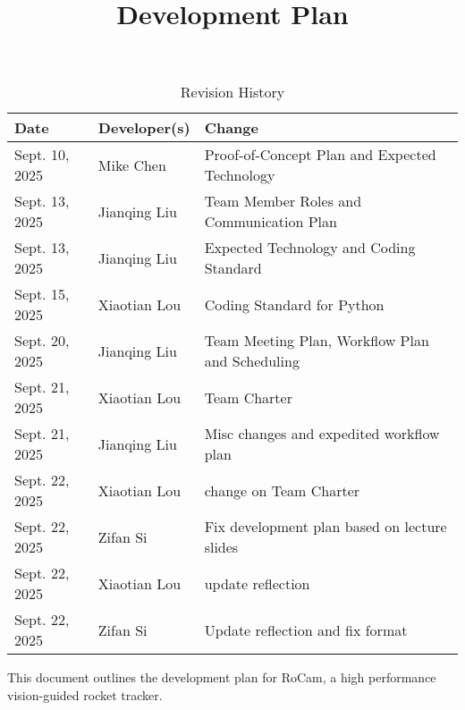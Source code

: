 \documentclass{article}
\title{Development Plan\\\progname}
\author{\authname}
\date{}
\begin{document}
\maketitle

\begin{table}[hp]
  \caption{Revision History} \label{TblRevisionHistory}
  \begin{tabularx}{\textwidth}{llX}
    \toprule
    \textbf{Date}  & \textbf{Developer(s)} & \textbf{Change}                                 \\
    \midrule
    Sept. 10, 2025 & Mike Chen             & Proof-of-Concept Plan and Expected Technology   \\
    Sept. 13, 2025 & Jianqing Liu          & Team Member Roles and Communication Plan        \\
    Sept. 13, 2025 & Jianqing Liu          & Expected Technology and Coding Standard         \\
    Sept. 15, 2025 & Xiaotian Lou          & Coding Standard for Python                      \\
    Sept. 20, 2025 & Jianqing Liu          & Team Meeting Plan, Workflow Plan and Scheduling \\
    Sept. 21, 2025 & Xiaotian Lou          & Team Charter                                    \\
    Sept. 21, 2025 & Jianqing Liu          & Misc changes and expedited workflow plan        \\
    Sept. 22, 2025 & Xiaotian Lou          & change on Team Charter                          \\
    Sept. 22, 2025 & Zifan Si              & Fix development plan based on lecture slides    \\
    Sept. 22, 2025 & Xiaotian Lou          & update reflection                               \\
    Sept. 22, 2025 & Zifan Si              & Update reflection and fix format                \\
    \bottomrule
  \end{tabularx}
\end{table}

\newpage{}

This document outlines the development plan for RoCam, a high performance
vision-guided rocket tracker.


\end{document}
